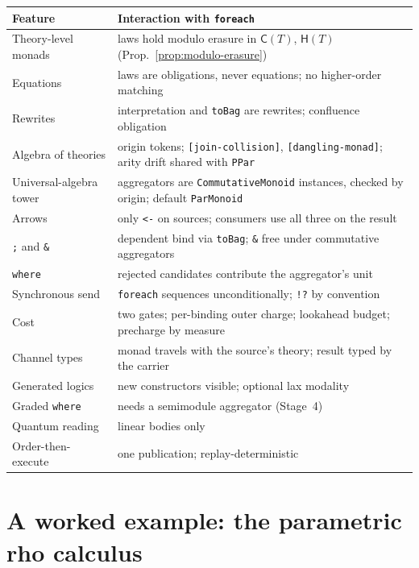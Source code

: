 \documentclass[11pt]{article}
\theoremstyle{branddef}
\theoremstyle{brandplain}
\theoremstyle{brandrem}
\newcommand{\rhoc}{\textsf{rho}}
\newcommand{\cost}{\mathsf{C}}
\newcommand{\hist}{\mathsf{H}}
\newcommand{\fe}{\texttt{foreach}}
\begin{document}
\begin{center}
\small
\begin{tabular}{@{}L{0.22\textwidth}L{0.70\textwidth}@{}}
\toprule
\textbf{Feature} & \textbf{Interaction with \fe{}} \\
\midrule
Theory-level monads & laws hold modulo erasure in \(\cost(T)\), \(\hist(T)\)
(Prop.~\ref{prop:modulo-erasure}) \\[2pt]
Equations & laws are obligations, never equations; no higher-order matching \\[2pt]
Rewrites & interpretation and \texttt{toBag} are rewrites; confluence
obligation \\[2pt]
Algebra of theories & origin tokens; \texttt{[join-collision]},
\texttt{[dangling-monad]}; arity drift shared with \texttt{PPar} \\[2pt]
Universal-algebra tower & aggregators are \texttt{CommutativeMonoid}
instances, checked by origin; default \texttt{ParMonoid} \\[2pt]
Arrows & only \texttt{<-} on sources; consumers use all three on the
result \\[2pt]
\texttt{;} and \texttt{\&} & dependent bind via \texttt{toBag}; \texttt{\&}
free under commutative aggregators \\[2pt]
\texttt{where} & rejected candidates contribute the aggregator's unit \\[2pt]
Synchronous send & \fe{} sequences unconditionally; \verb|!?| by
convention \\[2pt]
Cost & two gates; per-binding outer charge; lookahead budget; precharge by
measure \\[2pt]
Channel types & monad travels with the source's theory; result typed by the
carrier \\[2pt]
Generated logics & new constructors visible; optional lax modality \\[2pt]
Graded \texttt{where} & needs a semimodule aggregator (Stage~4) \\[2pt]
Quantum reading & linear bodies only \\[2pt]
Order-then-execute & one publication; replay-deterministic \\
\bottomrule
\end{tabular}
\end{center}

\section{A worked example: the parametric \texorpdfstring{\rhoc{}}{rho} calculus}
\label{sec:rho}
\end{document}
